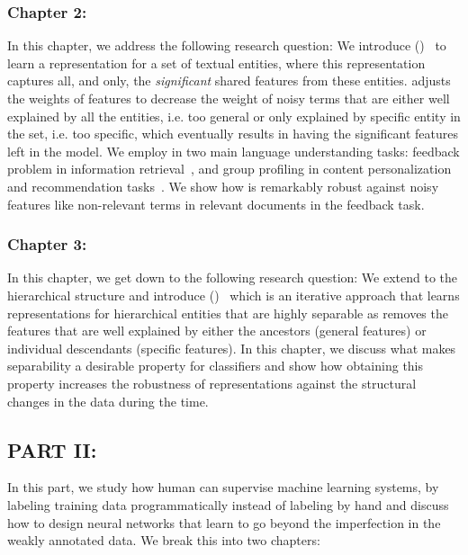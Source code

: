 \subsubsection*{Chapter 2: }
In this chapter, we address the following research question:
We introduce \emph{\swlm} (\acswlm)~\citep{Dehghani:2016:SIGIR} to learn a representation for a set of textual entities, where this representation captures all, and only, the \textit{significant} shared features from these entities.  \acswlm adjusts the weights of features to decrease the weight of noisy terms that are either well explained by all the entities, i.e. too general or only explained by specific entity in the set, i.e. too specific, which eventually results in having the significant features left in the model.  
We employ \acswlm in two main language understanding tasks: feedback problem in information retrieval~\citep{Dehghani:CIKM2016:long, Dehghani:CIKM2016:short}, and group profiling in content personalization and recommendation tasks~\citep{Dehghani:2016:CHIIR,Dehghani2016:trec}. We show how \acswlm is remarkably robust against noisy features like non-relevant terms in relevant documents in the feedback task. 

\subsubsection*{Chapter 3: }
In this chapter, we get down to the following research question:
We extend \emph{\swlms} to the hierarchical structure and introduce \emph{\hswlms} (\achswlm)~\citep{Dehghani:2016:ICTIR, Dehghani:2016:CLEF} which is an iterative approach that learns representations for hierarchical entities that are highly separable as \acswlm removes the features that are well explained by either the ancestors (general features) or individual descendants (specific features). In this chapter, we discuss what makes separability a desirable property for classifiers and show how obtaining this property increases the robustness of representations against the structural changes in the data during the time.

\subsection*{PART II: }
In this part, we study how human can supervise machine learning systems, by labeling training data programmatically instead of labeling by hand and discuss how to design neural networks that learn to go beyond the imperfection in the weakly annotated data. We break this into two chapters:

